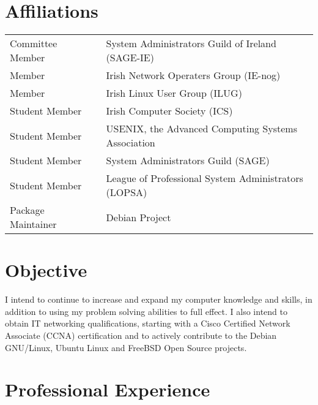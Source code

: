 \documentclass[a4paper, 11pt] {article}
\begin{document}
\section*{Affiliations}

\begin{tabular}{l l l}
Committee Member	&	&	System Administrators Guild of Ireland (SAGE-IE)	 \\
Member				&	&	Irish Network Operaters Group (IE-nog) 				 \\
Member				&	&	Irish Linux User Group (ILUG)								 \\
Student Member 	&	& 	Irish Computer Society (ICS)								 \\
Student Member 	&	& 	USENIX, the Advanced Computing Systems Association	 \\
Student Member 	&	& 	System Administrators Guild (SAGE)						 \\
Student Member 	&	& 	League of Professional System Administrators (LOPSA)\\
Package Maintainer&	& 	Debian Project													 \\
\end{tabular}

\section*{Objective}

I intend to continue to increase and expand my computer knowledge and
skills, in addition to using my problem solving abilities to full 
effect. I also intend to obtain IT networking qualifications, starting 
with a Cisco Certified Network Associate (CCNA) certification and to 
actively contribute to the Debian GNU/Linux, Ubuntu Linux and FreeBSD 
Open Source projects.

\pagebreak

\section*{Professional Experience}
\end{document}
